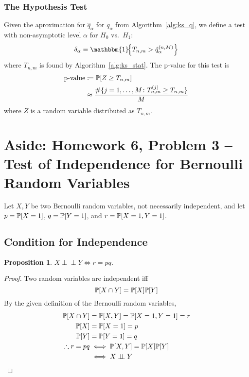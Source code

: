 \documentclass[letterpaper, oneside, reqno]{amsart}
\newtheorem{prop}{Proposition}[section]
\numberwithin{equation}{section}
\newcommand{\Prob}[1]{\mathbb{P}\mleft[#1\mright]}
\newcommand{\indep}{\perp \!\!\! \perp}  %
\newcommand{\indic}[1]{\mathbbm{1}\!\mleft\{#1\mright\}} %
\begin{document}
\subsubsection{The Hypothesis Test}
Given the aproximation for $\hat{q}_\alpha$ for $q_\alpha$ from
Algorithm~\ref{alg:ks_q}, we define a test with non-asymptotic level $\alpha$
for $H_0$ vs.\ $H_1$:
\begin{equation}
  \delta_\alpha = \indic{T_{n,m} > \hat{q}_\alpha^{(n, M)}}
\end{equation}
where $T_{n,m}$ is found by Algorithm~\ref{alg:ks_stat}. The p-value for this
test is
\begin{align}
  \text{p-value} &\coloneqq \Prob{Z \ge T_{n,m}} \\
  &\approx \frac{\#\{j = 1, \dots, M \colon T_{n,m}^{(j)} \ge T_{n,m}\}}{M}
\end{align}
where $Z$ is a random variable distributed as $T_{n,m}$.

\clearpage
\section{Aside: Homework 6, Problem 3 -- Test of Independence for Bernoulli Random Variables}
Let $X, Y$ be two Bernoulli random variables, not necessarily independent, and
let $p = \Prob{X=1}$, $q = \Prob{Y=1}$, and $r = \Prob{X=1, Y=1}$.

\subsection{Condition for Independence}
\begin{prop}
  $X \indep Y \iff r = pq$.
\end{prop}

\begin{proof}
  Two random variables are independent iff 
  \begin{equation}
    \Prob{X \cap Y} = \Prob{X}\Prob{Y} \label{eq:indep}
  \end{equation}
  By the given definition of the Bernoulli random variables,
  \begin{align*}
    \Prob{X \cap Y} &= \Prob{X, Y} = \Prob{X=1, Y=1} = r \\
    \Prob{X} &= \Prob{X=1} = p \\
    \Prob{Y} &= \Prob{Y=1} = q \\
    \therefore r = pq &\iff \Prob{X,Y} = \Prob{X}\Prob{Y} \\
    &\iff X \indep Y  \qedhere
  \end{align*}
\end{proof}
\end{document}
